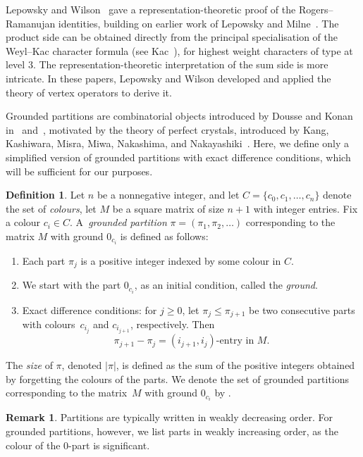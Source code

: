 \documentclass[10pt,a4paper]{amsart}
\numberwithin{equation}{section}
\theoremstyle{definition}
\newtheorem{Definition}[Theorem]{Definition}
\newtheorem{Remark}[Theorem]{Remark}
\begin{document}
Lepowsky and Wilson~\cite{LW84,LW85} gave a representation-theoretic
proof of the Rogers--Ramanujan identities, building on earlier work of
Lepowsky and Milne~\cite{LM78}. The product side can be obtained
directly from the principal specialisation of the Weyl--Kac character
formula (see Kac~\cite[Theorem 10.4]{Kac90}), for highest
weight characters of type  at level $3$. The
representation-theoretic interpretation of the sum side is more
intricate. In these papers, Lepowsky and Wilson developed and applied
the theory of vertex operators to derive it.

Grounded partitions are combinatorial objects introduced by Dousse and
Konan in~\cite{DK19b} and~\cite{DK22}, motivated by the theory of
perfect crystals, introduced by Kang, Kashiwara, Misra, Miwa,
Nakashima, and Nakayashiki~\cite{KMN92}. Here, we
define only a simplified version of grounded partitions with exact
difference conditions, which will be sufficient for our purposes.

\begin{Definition}\label{def:grounded_partitions}
 Let $ n $ be a nonnegative integer, and let
 $C=\{c_0,c_1,\ldots,c_n\}$ denote the set of \emph{colours}, let $M$ be a square matrix of size $n+1$ with integer entries.
 Fix a colour $c_i\in C$. A~\emph{grounded partition}
 $ \pi = (\pi_1, \pi_2, \dots ) $ corresponding to the
 matrix $M$ with ground $0_{c_i}$ is defined as follows:
\begin{enumerate}[label=(\roman*)]\itemsep=0pt
\item Each part $ \pi_j $ is a positive integer indexed by some colour in $C$.
\item We start with the part $0_{c_i}$, as an initial condition,
 called the \emph{ground}.
\item Exact difference conditions: for $ j \geq 0 $, let
 $\pi_{j}\leq\pi_{j+1}$ be two consecutive parts with
 colours~$c_{i_j}$ and $c_{i_{j+1}}$, respectively. Then
 \[
 \pi_{j+1}-\pi_{j} = (i_{j+1},i_j)\text{-entry in } M.
 \]
\end{enumerate}
The \emph{size} of $\pi$, denoted $|\pi|$, is defined as the
sum of the positive integers obtained by forgetting the colours of the parts. We denote the set of grounded partitions corresponding to the matrix~$M$ with ground $0_{c_i}$ by .
\end{Definition}

\begin{Remark}
Partitions are typically written in weakly decreasing order. For
grounded partitions, however, we list parts in weakly increasing
order, as the colour of the $ 0 $-part is significant.
\end{Remark}
\end{document}
